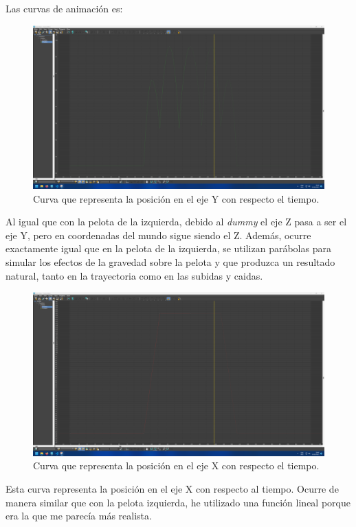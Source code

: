 \documentclass{article}
\begin{document}
Las curvas de animación es:

\begin{figure}[H]
    \centering
    \includegraphics[width=\textwidth]{imagenes/curvas/PR/pelota/green.png}
    \caption{Curva que representa la posición en el eje Y con respecto el tiempo.}
 \end{figure}

 Al igual que con la pelota de la izquierda, debido al \textit{dummy} el eje Z pasa a ser el eje Y, pero en coordenadas del mundo sigue siendo el Z. Además, ocurre exactamente igual que en la pelota de la izquierda, se utilizan parábolas para simular los efectos de la gravedad sobre la pelota y que produzca un resultado natural, tanto en la trayectoria como en las subidas y caidas.

 \begin{figure}[H]
    \centering
    \includegraphics[width=\textwidth]{imagenes/curvas/PR/pelota/red.png}
    \caption{Curva que representa la posición en el eje X con respecto el tiempo.}
 \end{figure}

Esta curva representa la posición en el eje X con respecto al tiempo. Ocurre de manera similar que con la pelota izquierda, he utilizado una función lineal porque era la que me parecía más realista.
\end{document}
